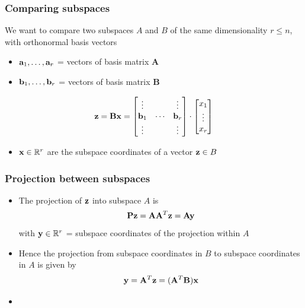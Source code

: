 \documentclass[t]{beamer} %
\begin{document}
\begin{frame}
  \frametitle{Comparing subspaces}

  We want to compare two subspaces $A$ and $B$ of the same dimensionality $r \leq n$, with
  orthonormal basis vectors
  \begin{itemize}
  \item $\va_1, \ldots, \va_r$ =  vectors of basis matrix $\mathbf{A}$
  \item $\vb_1, \ldots, \vb_r$ =  vectors of basis matrix $\mathbf{B}$
  \end{itemize}

  \[
    \vz = \mathbf{B} \vx =
    \begin{bmatrix}
      \vdots & & \vdots \\
      \vb_1 & \cdots & \vb_r \\
      \vdots & & \vdots
    \end{bmatrix}
    \cdot
    \begin{bmatrix}
      x_1 \\
      \vdots \\
      x_r
    \end{bmatrix}
  \]
  
  \begin{itemize}
  \item[\hand] $\vx\in \setR^r$ are the subspace coordinates of a vector $\vz\in B$
  \end{itemize}
\end{frame}


\begin{frame}
  \frametitle{Projection between subspaces}

  \begin{itemize}
  \item The projection of $\vz$ into subspace $A$ is
    \[
      \mathbf{P} \vz = \mathbf{A} \mathbf{A}^T \vz = \mathbf{A} \vy
    \]
    with $\vy\in \setR^r$ = subspace coordinates of the projection within $A$
  \item Hence the projection from subspace coordinates in $B$ to subspace coordinates in $A$ is given by
    \[
      \vy = \mathbf{A}^T \vz = (\mathbf{A}^T \mathbf{B}) \vx
    \]
  \item {}
  \end{itemize}
\end{frame}
\end{document}
